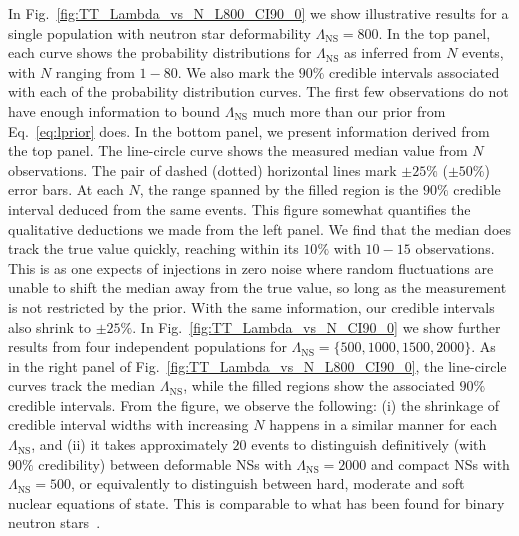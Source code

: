 \documentclass[aps,prd,amsmath,floats,floatfix, twocolumn,
superscriptaddress,nofootinbib,showpacs]{revtex4-1}
\newcommand{\lambdans}{\Lambda_\mathrm{NS}}
\begin{document}
In Fig.~\ref{fig:TT_Lambda_vs_N_L800_CI90_0} we show illustrative results
for a single population with neutron star deformability $\lambdans=800$.
In the top panel, each curve shows the 
probability distributions for $\lambdans$ as inferred from $N$ events, with $N$
ranging from $1-80$. We also mark the $90\%$ credible intervals associated
with each of the probability distribution curves. The first few observations
do not have enough information to bound $\lambdans$ much more than
our prior from Eq.~\ref{eq:lprior} does. 
% 
In the bottom panel, we present information derived from the top panel.
The line-circle curve shows the measured median value from $N$ observations.
The pair of dashed (dotted) horizontal lines mark
$\pm25\%$ ($\pm50\%$) error bars. At each $N$, the range spanned by the 
filled region is the $90\%$ credible interval deduced from the same 
events. This figure somewhat quantifies the qualitative deductions we made
from the left panel. We find that the median does track the true value quickly,
reaching within its $10\%$ with $10-15$ observations. This is as one expects of 
injections in zero noise where random fluctuations are unable to shift the
median away from the true value, so long as the measurement is not restricted
by the prior. With the same information, our credible intervals also shrink to $\pm 25\%$.
% 
In Fig.~\ref{fig:TT_Lambda_vs_N_CI90_0} we show further results from four
independent populations for $\lambdans=\{500,1000,1500,2000\}$. As in the 
right panel of Fig.~\ref{fig:TT_Lambda_vs_N_L800_CI90_0}, the line-circle curves
track the median $\lambdans$, while the filled regions show
the associated $90\%$ credible intervals. From the figure, we observe
the following: (i) the shrinkage of credible interval widths with increasing
$N$ happens in a similar manner for each $\lambdans$, 
and (ii) it takes
approximately $20$ events to distinguish definitively (with $90\%$ credibility)
between deformable NSs with $\lambdans=2000$ and compact NSs with 
$\lambdans=500$, or equivalently to distinguish between hard, moderate and soft
nuclear equations of state. This is comparable to what has been found for
binary neutron stars~\cite{DelPozzo:13,Chatziioannou:2015uea,Agathos:2015a}.
\end{document}
